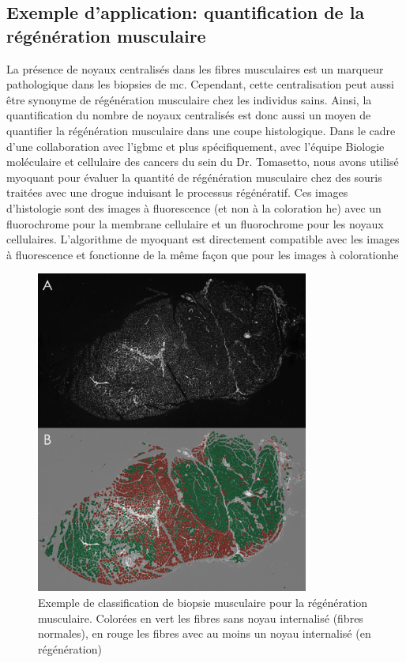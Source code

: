 \subsection{Exemple d'application: quantification de la régénération musculaire }
La présence de noyaux centralisés dans les fibres musculaires est un marqueur pathologique dans les biopsies de \gls{mc}. Cependant, cette centralisation peut aussi être synonyme de régénération musculaire chez les individus sains. Ainsi, la quantification du nombre de noyaux centralisés est donc aussi un moyen de quantifier la régénération musculaire dans une coupe histologique. Dans le cadre d'une collaboration avec l'\gls{igbmc} et plus spécifiquement, avec l'équipe Biologie moléculaire et cellulaire des cancers du sein du Dr. Tomasetto, nous avons utilisé \gls{myoquant} pour évaluer la quantité de régénération musculaire chez des souris traitées avec une drogue induisant le processus régénératif. Ces images d'histologie sont des images à fluorescence (et non à la coloration \gls{he}) avec un fluorochrome pour la membrane cellulaire et un fluorochrome pour les noyaux cellulaires. L'algorithme de \gls{myoquant} est directement compatible avec les images à fluorescence et fonctionne de la même façon que pour les images à coloration\gls{he}
\begin{figure}[!ht]
 \centering
 \includegraphics[width=0.8\textwidth]{figures/fluo_nuc.png}
 \caption[Exemple de classification de biopsie musculaire pour la régénération musculaire]{Exemple de classification de biopsie musculaire pour la régénération musculaire. Colorées en vert les fibres sans noyau internalisé (fibres normales), en rouge les fibres avec au moins un noyau internalisé (en régénération)}
 \label{fig:fluo_paint}
\end{figure}

